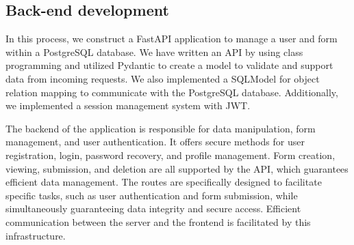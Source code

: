 \documentclass[12pt,oneside,openright,a4paper]{cpe-english-project}
\begin{document}
\subsection{Back-end development}

In this process, we construct a FastAPI application to manage a user and form within a PostgreSQL database. We have written an API by using class programming and utilized Pydantic to create a model to validate and support data from incoming requests. We also implemented a SQLModel for object relation mapping to communicate with the PostgreSQL database. Additionally, we implemented a session management system with JWT.

The backend of the application is responsible for data manipulation, form management, and user authentication. It offers secure methods for user registration, login, password recovery, and profile management. Form creation, viewing, submission, and deletion are all supported by the API, which guarantees efficient data management. The routes are specifically designed to facilitate specific tasks, such as user authentication and form submission, while simultaneously guaranteeing data integrity and secure access. Efficient communication between the server and the frontend is facilitated by this infrastructure.
\end{document}
